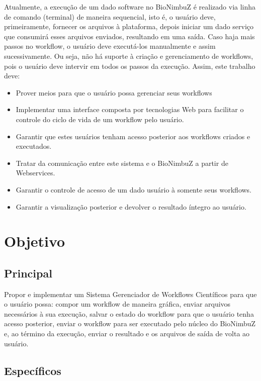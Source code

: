 Atualmente, a execução de um dado software no BioNimbuZ é realizado via linha de comando (terminal) de maneira sequencial, isto é, o usuário deve, primeiramente, fornecer os arquivos à plataforma, depois iniciar um dado serviço que consumirá esses arquivos enviados, resultando em uma saída. Caso haja mais passos no workflow, o usuário deve executá-los manualmente e assim sucessivamente. Ou seja, não há suporte à criação e gerenciamento de workflows, pois o usuário deve intervir em todos os passos da execução. Assim, este trabalho deve:
\begin{itemize}
    \item Prover meios para que o usuário possa gerenciar seus workflows
    \item Implementar uma interface composta por tecnologias Web para facilitar o controle do ciclo de vida de um workflow pelo usuário.
    \item Garantir que estes usuários tenham acesso posterior aos workflows criados e executados.
    \item Tratar da comunicação entre este sistema e o BioNimbuZ a partir de Webservices.
    \item Garantir o controle de acesso de um dado usuário à somente seus workflows.
    \item Garantir a visualização posterior e devolver o resultado íntegro ao usuário.
\end{itemize}
	

\section{Objetivo} \label{1title4}

\subsection{Principal}

Propor e implementar um Sistema Gerenciador de Workflows Científicos para que o usuário possa: compor um workflow de maneira gráfica, enviar arquivos necessários à sua execução, salvar o estado do workflow para que o usuário tenha acesso posterior, enviar o workflow para ser executado pelo núcleo do BioNimbuZ e, ao término da execução, enviar o resultado e os arquivos de saída de volta ao usuário.

\subsection{Específicos}
